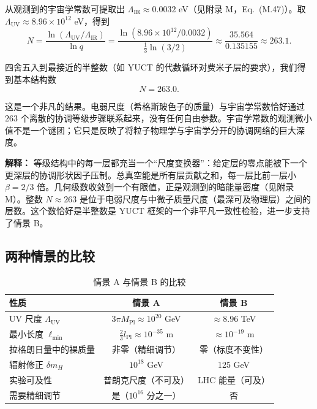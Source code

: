 \documentclass[11pt,a4paper]{article}
\newcommand{\Mpl}{M_{\mathrm{Pl}}}
\newcommand{\Lpl}{l_{\mathrm{Pl}}}
\newcommand{\Lmin}{\ell_{\min}}
\newcommand{\LUV}{\Lambda_{\mathrm{UV}}}
\theoremstyle{remark}
\begin{document}
	从观测到的宇宙学常数可提取出 \(\Lambda_{\mathrm{IR}} \approx 0.0032\) eV（见附录 M，Eq.~(M.47)）。取 \(\LUV \approx 8.96 \times 10^{12}\) eV，得到
	\begin{equation}
		N = \frac{\ln(\LUV / \Lambda_{\mathrm{IR}})}{\ln q}
		= \frac{\ln(8.96 \times 10^{12} / 0.0032)}{\frac{1}{3}\ln(3/2)}
		\approx \frac{35.564}{0.135155} \approx 263.1.
		\label{eq:N_layers}
	\end{equation}
	
	四舍五入到最接近的半整数（如 YUCT 的代数循环对费米子层的要求），我们得到基本结构数
	\begin{equation}
		\boxed{N = 263.0}.
	\end{equation}
	
	这是一个非凡的结果。电弱尺度（希格斯玻色子的质量）与宇宙学常数恰好通过 \(263\) 个离散的协调等级步骤联系起来，没有任何自由参数。宇宙学常数的观测微小值不是一个谜团；它只是反映了将粒子物理学与宇宙学分开的协调网络的巨大深度。
	
	\textbf{解释：} 等级结构中的每一层都充当一个“尺度变换器”：给定层的零点能被下一个更深层的协调形状因子压制。总真空能是所有层贡献之和，每一层比前一层小 \(\beta = 2/3\) 倍。几何级数收敛到一个有限值，正是观测到的暗能量密度（见附录 M）。整数 \(N \approx 263\) 是位于电弱尺度与中微子质量尺度（最深可及物理层）之间的层数。这个数恰好是半整数是 YUCT 框架的一个非平凡一致性检验，进一步支持了情景 B。
	
	\subsection{两种情景的比较}
	
	\begin{table}[H]
		\centering
		\caption{情景 A 与情景 B 的比较}
		\label{tab:scenarios}
		\small
		\begin{tabular}{@{}lcc@{}}
			\toprule
			\textbf{性质} & \textbf{情景 A} & \textbf{情景 B} \\
			\midrule
			UV 尺度 \(\LUV\) & \(3\pi\Mpl \approx 10^{20}\) GeV & \(\approx 8.96\) TeV \\
			最小长度 \(\Lmin\) & \(\frac{2}{3}\Lpl \approx 10^{-35}\) m & \(\approx 10^{-19}\) m \\
			拉格朗日量中的裸质量 & 非零（精细调节） & 零（标度不变性） \\
			辐射修正 \(\delta m_H\) & \(10^{18}\) GeV & 125 GeV \\
			实验可及性 & 普朗克尺度（不可及） & LHC 能量（可及） \\
			需要精细调节 & 是（\(10^{16}\) 分之一） & 否 \\
			\bottomrule
		\end{tabular}
	\end{table}
	
\end{document}
